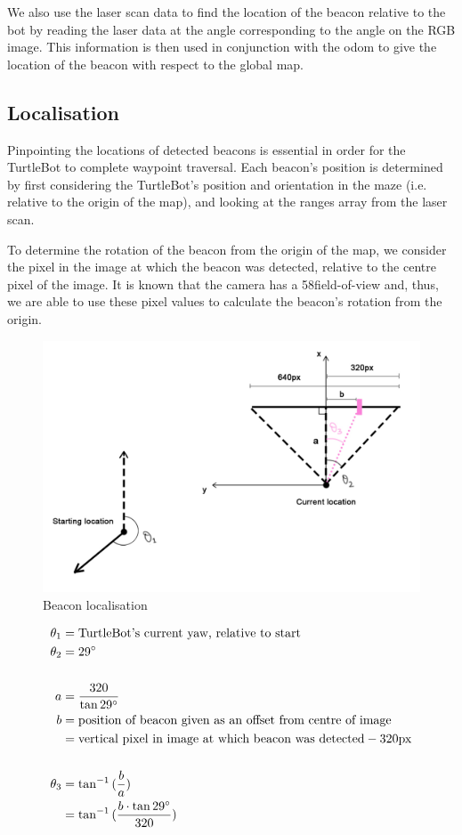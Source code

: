 \documentclass[titlepage,12pt,a4paper]{article}
\begin{document}
We also use the laser scan data to find the location of the beacon relative to the bot by reading the laser data at the angle corresponding to the angle on the RGB image. This information is then used in conjunction with the odom to give the location of the beacon with respect to the global map. 

\subsection{Localisation}
Pinpointing the locations of detected beacons is essential in order for the TurtleBot to complete waypoint traversal. Each beacon's position is determined by first considering the TurtleBot's position and orientation in the maze (i.e. relative to the origin of the map), and looking at the ranges array from the laser scan. 

To determine the rotation of the beacon from the origin of the map, we consider the pixel in the image at which the beacon was detected, relative to the centre pixel of the image. It is known that the camera has a 58\degree field-of-view and, thus, we are able to use these pixel values to calculate the beacon's rotation from the origin. 

\begin{figure}[h]
	\includegraphics[scale=0.3]{beacon.jpg}
	\caption{Beacon localisation}
\end{figure}

\begin{align*}
	\theta_1   &=  \text{TurtleBot's current yaw, relative to start} \\
	\theta_2   &=  29\degree \\
	\\
	a 	        &=  \frac{320}{\tan{29\degree}} \\ 
	b 	        &=  \text{position of beacon given as an offset from centre of image} \\
			&=  \text{vertical pixel in image at which beacon was detected} - 320\text{px} \\
	\\
	\theta_3   &= \tan^{-1}{(\frac{b}{a})} \\
		        &= \tan^{-1}{(\frac{b \cdot \tan{29\degree}}{320})} 
\end{align*}
\end{document}

